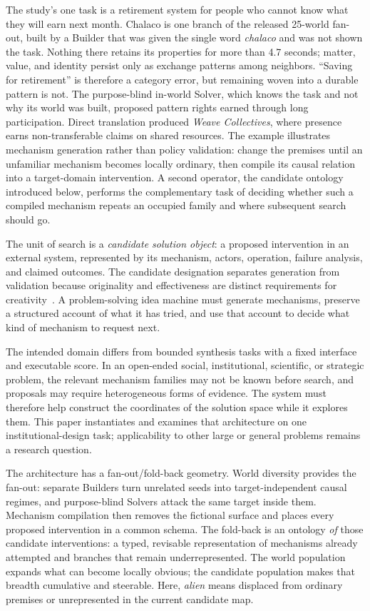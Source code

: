 \documentclass[11pt,a4paper]{article}
\begin{document}
The study's one task is a retirement system for people who cannot know what they will earn next month. Chalaco is one branch of the released 25-world fan-out, built by a Builder that was given the single word \emph{chalaco} and was not shown the task. Nothing there retains its properties for more than 4.7 seconds; matter, value, and identity persist only as exchange patterns among neighbors. ``Saving for retirement'' is therefore a category error, but remaining woven into a durable pattern is not. The purpose-blind in-world Solver, which knows the task and not why its world was built, proposed pattern rights earned through long participation. Direct translation produced \emph{Weave Collectives}, where presence earns non-transferable claims on shared resources. The example illustrates mechanism generation rather than policy validation: change the premises until an unfamiliar mechanism becomes locally ordinary, then compile its causal relation into a target-domain intervention. A second operator, the candidate ontology introduced below, performs the complementary task of deciding whether such a compiled mechanism repeats an occupied family and where subsequent search should go.

The unit of search is a \emph{candidate solution object}: a proposed intervention in an external system, represented by its mechanism, actors, operation, failure analysis, and claimed outcomes. The candidate designation separates generation from validation because originality and effectiveness are distinct requirements for creativity~\cite{runco2012standard}. A problem-solving idea machine must generate mechanisms, preserve a structured account of what it has tried, and use that account to decide what kind of mechanism to request next.

The intended domain differs from bounded synthesis tasks with a fixed interface and executable score. In an open-ended social, institutional, scientific, or strategic problem, the relevant mechanism families may not be known before search, and proposals may require heterogeneous forms of evidence. The system must therefore help construct the coordinates of the solution space while it explores them. This paper instantiates and examines that architecture on one institutional-design task; applicability to other large or general problems remains a research question.

The architecture has a fan-out/fold-back geometry. World diversity provides the fan-out: separate Builders turn unrelated seeds into target-independent causal regimes, and purpose-blind Solvers attack the same target inside them. Mechanism compilation then removes the fictional surface and places every proposed intervention in a common schema. The fold-back is an ontology \emph{of} those candidate interventions: a typed, revisable representation of mechanisms already attempted and branches that remain underrepresented. The world population expands what can become locally obvious; the candidate population makes that breadth cumulative and steerable. Here, \emph{alien} means displaced from ordinary premises or unrepresented in the current candidate map.
\end{document}
